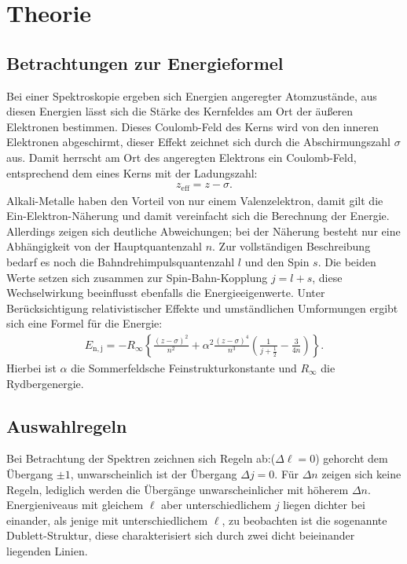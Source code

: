 \section{Theorie}
\label{sec:Theorie}
\subsection{Betrachtungen zur Energieformel}
Bei einer Spektroskopie ergeben sich Energien angeregter Atomzustände, aus diesen Energien lässt sich die Stärke
des Kernfeldes am Ort der äußeren Elektronen bestimmen. Dieses Coulomb-Feld des Kerns wird von den inneren Elektronen
abgeschirmt, dieser Effekt zeichnet sich durch die Abschirmungszahl $\sigma$ aus. Damit herrscht am Ort des angeregten Elektrons
ein Coulomb-Feld, entsprechend dem eines Kerns mit der Ladungszahl:
\begin{align}
  z_\mathrm{eff} = z-\sigma.
\end{align}
Alkali-Metalle haben den Vorteil von nur einem Valenzelektron, damit gilt die Ein-Elektron-Näherung und damit vereinfacht sich die Berechnung der Energie.
Allerdings zeigen sich deutliche Abweichungen; bei der Näherung besteht nur eine Abhängigkeit von der Hauptquantenzahl $n$.
Zur vollständigen Beschreibung bedarf es noch die Bahndrehimpulsquantenzahl $l$ und den Spin $s$. Die beiden Werte setzen sich zusammen
zur Spin-Bahn-Kopplung $j=l+s$, diese Wechselwirkung beeinflusst ebenfalls die Energieeigenwerte.
Unter Berücksichtigung relativistischer Effekte und umständlichen Umformungen ergibt sich eine Formel für die Energie:
\begin{align}
  E_\mathrm{n,j}=-R_\mathrm{\infty}\left\{\frac{(z-\sigma)^2}{n^2}+\alpha^2\frac{(z-\sigma)^4}{n^3}\left(\frac{1}{j+\frac{1}{2}}-\frac{3}{4n}\right)\right\}.\label{eqn:sf}
\end{align}
Hierbei ist $\alpha$ die Sommerfeldsche Feinstrukturkonstante und $R_\mathrm{\infty}$ die Rydbergenergie.

\subsection{Auswahlregeln}
Bei Betrachtung der Spektren zeichnen sich Regeln ab:($\Delta\ell=0$) gehorcht dem Übergang $\pm 1$, unwarscheinlich ist der Übergang
$\Delta j=0$. Für $\Delta n$ zeigen sich keine Regeln, lediglich werden die Übergänge unwarscheinlicher mit höherem $\Delta n$.
Energieniveaus mit gleichem $\ell$ aber unterschiedlichem $j$ liegen dichter bei einander, als jenige mit unterschiedlichem $\ell$, zu beobachten
ist die sogenannte Dublett-Struktur, diese charakterisiert sich durch zwei dicht beieinander liegenden Linien.

